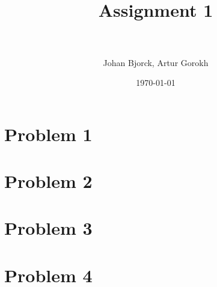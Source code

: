\documentclass[paper=a4, fontsize=10pt]{scrartcl} %
\title{ 
\normalfont \normalsize
\horrule{0.5pt} \\[0.2cm] %
\huge Assignment 1 \\ %
\horrule{1pt} \\[0.2cm] %
}
\author{Johan Bjorck, Artur Gorokh} %
\date{\normalsize\today} %
\numberwithin{equation}{section} %
\numberwithin{figure}{section} %
\numberwithin{table}{section} %
\begin{document}
\maketitle %

\section*{Problem 1}

\section*{Problem 2}

\section*{Problem 3}

\section*{Problem 4}

\end{document}
